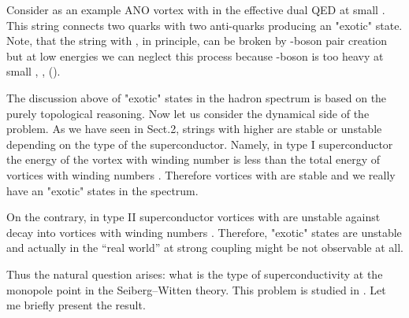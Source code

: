 \documentclass[a4paper,12pt]{article}
\begin{document}
Consider as an example  ANO vortex with \coordHE{}
in the effective dual QED at small \myHighlight{$\mu$}\coordHE{}. This
 string connects two quarks with two anti-quarks producing
an "exotic" state.  Note, that the string with \coordHE{}, in principle,
can be broken by \coordHE{}-boson pair creation but at low energies
 we
can neglect this process because \coordHE{}-boson is too heavy
at small \myHighlight{$\mu$}\coordHE{}, \myHighlight{$\mu \ll\Lambda$}\coordHE{} ,
(\coordHE{}).

The discussion above of "exotic" states in the hadron spectrum
\cite{S} is based on the purely topological reasoning. Now let
us consider the dynamical side of the problem. As we have seen
in Sect.2, strings with higher \coordHE{} are stable or unstable
depending on the type of the superconductor. Namely,  in type I
superconductor the energy of the vortex with winding number \coordHE{}
is less than the total energy of \coordHE{} vortices  with winding
numbers \coordHE{}.  Therefore vortices  with \coordHE{} are stable and we
really have an "exotic" states in the spectrum.

On the contrary, in type II superconductor vortices with \coordHE{}
are unstable against decay into \coordHE{} vortices with winding
numbers \coordHE{}. Therefore, "exotic" states are unstable and
actually in the ``real world'' at strong coupling might be not
observable at all.

Thus the natural question arises: what is the type of
superconductivity at the monopole point in the Seiberg--Witten
theory. This problem is studied in \cite{VY}. Let me briefly
present the result.
\end{document}
